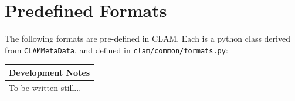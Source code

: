 \documentclass[a4paper,12pt]{report}
\newenvironment{devnotes}
{\newpage
\begin{center}
    \begin{tabular}[h!]{|p{0.8\textwidth}|}
    \hline
    {\bf Development Notes}\\\hline}
{   \\\hline
    \end{tabular}
\end{center}}
\begin{document}
\chapter{Predefined Formats}

The following formats are pre-defined in CLAM. Each is a python class derived from \texttt{CLAMMetaData}, and defined in \texttt{clam/common/formats.py}:

\begin{devnotes}
To be written still...
\end{devnotes}

\end{document}

